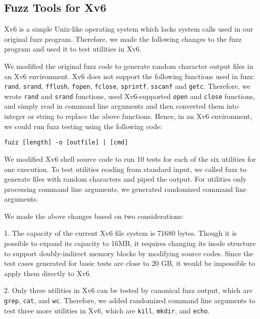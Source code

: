 \subsection{Fuzz Tools for Xv6}
Xv6 is a simple Unix-like operating system which lacks system calls used in our original fuzz program. Therefore, we made the following changes to the fuzz program and used it to test utilities in Xv6.

We modified the original fuzz code to generate random character output files in an Xv6 environment. Xv6 does not support the following functions used in fuzz: \texttt{rand}, \texttt{srand}, \texttt{fflush}, \texttt{fopen}, \texttt{fclose}, \texttt{sprintf}, \texttt{sscanf} and \texttt{getc}. Therefore, we wrote \texttt{rand} and \texttt{srand} functions, used Xv6-supported \texttt{open} and \texttt{close} functions, and simply read in command line arguments and then converted them into integer or string to replace the above functions. Hence, in an Xv6 environment, we could run fuzz testing using the following code:

\texttt{fuzz [length] -o [outfile] | [cmd]}  

We modified Xv6 shell source code to run 10 tests for each of the six utilities for one execution. To test utilities reading from standard input, we called fuzz to generate files with random characters and piped the output. For utilities only processing command line arguments, we generated randomized command line arguments. 

We made the above changes based on two considerations: 

1. The capacity of the current Xv6 file system is 71680 bytes. Though it is possible to expand its capacity to 16MB, it requires changing its inode structure to support doubly-indirect memory blocks by modifying source codes\cite{Xv6manual}. Since the test cases generated for basic tests are close to 20 GB, it would be impossible to apply them directly to Xv6.

2. Only three utilities in Xv6 can be tested by canonical fuzz output, which are \texttt{grep}, \texttt{cat}, and \texttt{wc}. Therefore, we added randomized command line arguments to test three more utilities in Xv6, which are \texttt{kill}, \texttt{mkdir}, and \texttt{echo}. 